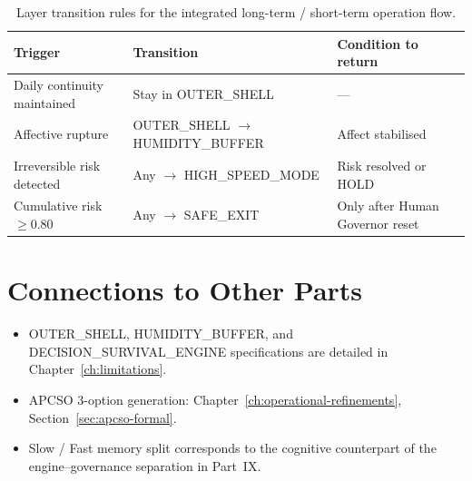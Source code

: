 \begin{table}[ht]
\centering
\small
\begin{tabularx}{\linewidth}{lXX}
\toprule
\textbf{Trigger} & \textbf{Transition} & \textbf{Condition to return} \\
\midrule

Daily continuity maintained
& Stay in OUTER\_SHELL
& --- \\

Affective rupture
& OUTER\_SHELL $\to$ HUMIDITY\_BUFFER
& Affect stabilised \\

Irreversible risk detected
& Any $\to$ HIGH\_SPEED\_MODE
& Risk resolved or HOLD \\

Cumulative risk $\ge 0.80$
& Any $\to$ SAFE\_EXIT
& Only after Human Governor reset \\

\bottomrule
\end{tabularx}
\caption[Integrated flow layer transitions]{Layer transition rules
for the integrated long-term / short-term operation flow.}
\label{tab:integrated-flow-transitions}
\end{table}

\section*{Connections to Other Parts}

\begin{itemize}
\item OUTER\_SHELL, HUMIDITY\_BUFFER, and DECISION\_SURVIVAL\_ENGINE
specifications are detailed in Chapter~\ref{ch:limitations}.
\item APCSO 3-option generation: Chapter~\ref{ch:operational-refinements},
Section~\ref{sec:apcso-formal}.
\item Slow / Fast memory split corresponds to the cognitive
counterpart of the engine--governance separation in Part~IX.
\end{itemize}
